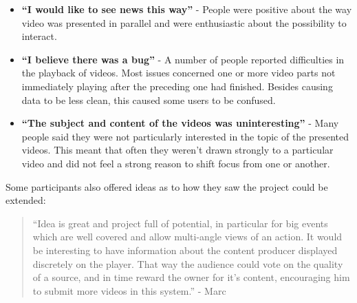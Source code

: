 \begin{itemize}
  \item \textbf{``I would like to see news this way''} - People were positive about the way video was presented in parallel and were enthusiastic about the possibility to interact.
  \item \textbf{``I believe there was a bug''} - A number of people reported difficulties in the playback of videos. Most issues concerned one or more video parts not immediately playing after the preceding one had finished. Besides causing data to be less clean, this caused some users to be confused.
  \item \textbf{``The subject and content of the videos was uninteresting''} - Many people said they were not particularly interested in the topic of the presented videos. This meant that often they weren't drawn strongly to a particular video and did not feel a strong reason to shift focus from one or another.
\end{itemize}

Some participants also offered ideas as to how they saw the project could be extended:

\begin{quote}
  ``Idea is great and project full of potential, in particular for big events which are well covered and allow multi-angle views of an action. It would be interesting to have information about the content producer displayed discretely on the player. That way the audience could vote on the quality of a source, and in time reward the owner for it's content, encouraging him to submit more videos in this system.'' - Marc
\end{quote}








